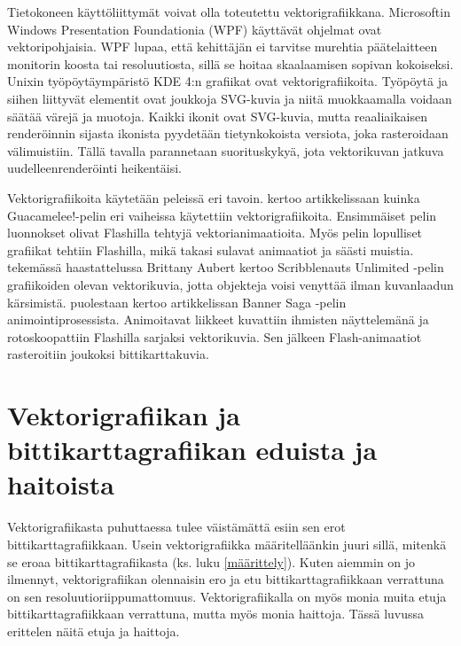 \documentclass[utf8,bachelor]{gradu3}
\begin{document}
Tietokoneen käyttöliittymät voivat olla toteutettu vektorigrafiikkana. Microsoftin Windows Presentation Foundationia (WPF) käyttävät ohjelmat ovat vektoripohjaisia. WPF lupaa, että kehittäjän ei tarvitse murehtia päätelaitteen monitorin koosta tai resoluutiosta, sillä se hoitaa skaalaamisen sopivan kokoiseksi. \parencite{RefWorks:doc:5bde3d66e4b0a1f99c63ae5a} Unixin työpöytäympäristö KDE 4:n grafiikat ovat vektorigrafiikoita. Työpöytä ja siihen liittyvät elementit ovat joukkoja SVG-kuvia ja niitä muokkaamalla voidaan säätää värejä ja muotoja. Kaikki ikonit ovat SVG-kuvia, mutta reaaliaikaisen renderöinnin sijasta ikonista pyydetään tietynkokoista versiota, joka rasteroidaan välimuistiin. Tällä tavalla parannetaan suorituskykyä, jota vektorikuvan jatkuva uudelleenrenderöinti heikentäisi. \parencite{RefWorks:doc:5bded7f3e4b09dfad48b846c}

Vektorigrafiikoita käytetään peleissä eri tavoin. \textcite{RefWorks:doc:5bdc818be4b0965708b5a0f0} kertoo artikkelissaan kuinka Guacamelee!-pelin eri vaiheissa käytettiin vektorigrafiikoita. Ensimmäiset pelin luonnokset olivat Flashilla tehtyjä vektorianimaatioita. Myös pelin lopulliset grafiikat tehtiin Flashilla, mikä takasi sulavat animaatiot ja säästi muistia. \parencite{RefWorks:doc:5bdc818be4b0965708b5a0f0} \textcite{RefWorks:doc:5bdc7473e4b05afcfde5d742} tekemässä haastattelussa Brittany Aubert kertoo Scribblenauts Unlimited -pelin grafiikoiden olevan vektorikuvia, jotta objekteja voisi venyttää ilman kuvanlaadun kärsimistä. \textcite{RefWorks:doc:5bd88176e4b0afdabde2b8e2} puolestaan kertoo artikkelissan Banner Saga -pelin animointiprosessista. Animoitavat liikkeet kuvattiin ihmisten näyttelemänä ja rotoskoopattiin Flashilla sarjaksi vektorikuvia. Sen jälkeen Flash-animaatiot rasteroitiin joukoksi bittikarttakuvia. \parencite{RefWorks:doc:5bd88176e4b0afdabde2b8e2}

\section{Vektorigrafiikan ja bittikarttagrafiikan eduista ja haitoista}


Vektorigrafiikasta puhuttaessa tulee väistämättä esiin sen erot bittikarttagrafiikkaan. Usein vektorigrafiikka määritelläänkin juuri sillä, mitenkä se eroaa bittikarttagrafiikasta (ks. luku \ref{määrittely}). Kuten aiemmin on jo ilmennyt, vektorigrafiikan olennaisin ero ja etu bittikarttagrafiikkaan verrattuna on sen resoluutioriippumattomuus. Vektorigrafiikalla on myös monia muita etuja bittikarttagrafiikkaan verrattuna, mutta myös monia haittoja. Tässä luvussa erittelen näitä etuja ja haittoja.
\end{document}
